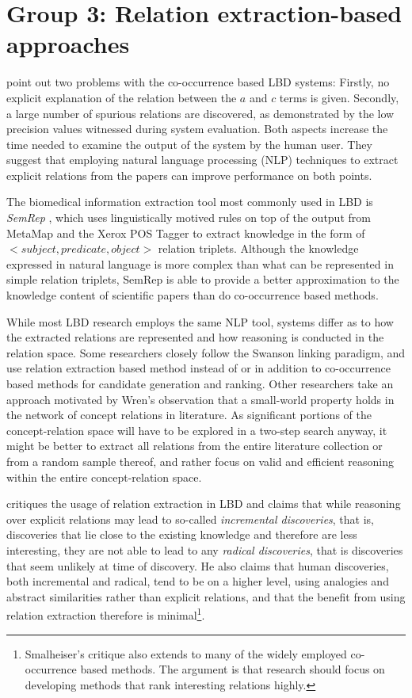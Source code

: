 \section{Group 3: Relation extraction-based approaches}
\label{sec:relex}	

\citet{hri06} point out two problems with the co-occurrence based LBD systems: Firstly, no explicit explanation of the relation between the $a$ and $c$ terms is given. Secondly, a large number of spurious relations are discovered, as demonstrated by the low precision values witnessed during system evaluation. Both aspects increase the time needed to examine the output of the system by the human user. They suggest that employing natural language processing (NLP) techniques to extract explicit relations from the papers can improve performance on both points.

The biomedical information extraction tool most commonly used in LBD is \emph{SemRep} \cite{rin03}, which uses linguistically motived rules on top of the output from MetaMap and the Xerox POS Tagger to extract knowledge in the form of $<subject, predicate, object>$ relation triplets. Although the knowledge expressed in natural language is more complex than what can be represented in simple relation triplets, SemRep is able to provide a better approximation to the knowledge content of scientific papers than do co-occurrence based methods.

While most LBD research employs the same NLP tool, systems differ as to how the extracted relations are represented and how reasoning is conducted in the relation space. Some researchers closely follow the Swanson linking paradigm, and use relation extraction based method instead of or in addition to co-occurrence based methods for candidate generation and ranking. Other researchers take an approach motivated by Wren's observation that a small-world property holds in the network of concept relations in literature.
As significant portions of the concept-relation space will have to be explored in a two-step search anyway, it might be better to extract all relations from the entire literature collection or from a random sample thereof, and rather focus on valid and efficient reasoning within the entire concept-relation space. 

\citet{sma12} critiques the usage of relation extraction in LBD and claims that while reasoning over explicit relations may lead to so-called \emph{incremental discoveries}, that is, discoveries that lie close to the existing knowledge and therefore are less interesting, they are not able to lead to any \emph{radical discoveries}, that is discoveries that seem unlikely at time of discovery. He also claims that human discoveries, both incremental and radical, tend to be on a higher level, using analogies and abstract similarities rather than explicit relations, and that the benefit from using relation extraction therefore is minimal\footnote{Smalheiser's critique also extends to many of the widely employed co-occurrence based methods. The argument is that research should focus on developing methods that rank interesting relations highly.}.


